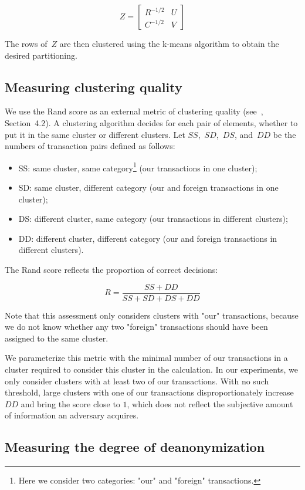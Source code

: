 \[
Z = 
\begin{bmatrix}
R^{-1/2} & U \\
C^{-1/2} & V
\end{bmatrix}
\]

The rows of~$Z$ are then clustered using the k-means algorithm to obtain the desired partitioning.


\subsection{Measuring clustering quality}

We use the Rand score as an external metric of clustering quality (see~\cite{Amigo2009}, Section~4.2).
A clustering algorithm decides for each pair of elements, whether to put it in the same cluster or different clusters.
Let $SS$,~$SD$,~$DS$, and~$DD$ be the numbers of transaction pairs defined as follows:
\begin{itemize}
	\item SS: same cluster, same category\footnote{Here we consider two categories: "our" and "foreign" transactions.} (our transactions in one cluster);
	\item SD: same cluster, different category (our and foreign transactions in one cluster);
	\item DS: different cluster, same category (our transactions in different clusters);
	\item DD: different cluster, different category (our and foreign transactions in different clusters).
\end{itemize}

The Rand score reflects the proportion of correct decisions:

\[
R = \frac{SS + DD}{SS + SD + DS + DD}
\]

Note that this assessment only considers clusters with "our" transactions, because we do not know whether any two "foreign" transactions should have been assigned to the same cluster.

We parameterize this metric with the minimal number of our transactions in a cluster required to consider this cluster in the calculation.
In our experiments, we only consider clusters with at least two of our transactions.
With no such threshold, large clusters with one of our transactions disproportionately increase $DD$ and bring the score close to $1$, which does not reflect the subjective amount of information an adversary acquires.


\subsection{Measuring the degree of deanonymization}

